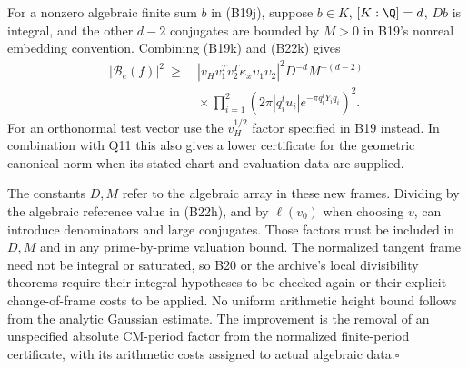 For a nonzero algebraic finite sum $b$ in (B19j), suppose
$b\in K$, $[K:\Q]=d$, $Db$ is integral, and the other
$d-2$ conjugates are bounded by $M>0$ in B19's nonreal
embedding convention.  Combining (B19k) and (B22k) gives
\[
\begin{split}
 |\mathcal B_e(f)|^2\ \geq\ &
 |v_Hv_1^Tv_2^T\kappa_x\upsilon_1\upsilon_2|^2
       D^{-d}M^{-(d-2)}\\
 &{}\times\prod_{i=1}^2
        \left(2\pi|q_i^tu_i|
                      e^{-\pi q_i^tY_iq_i}\right)^2.
\end{split}
 \tag{B22l}
\]
For an orthonormal test vector use the $v_H^{1/2}$ factor
specified in B19 instead.  In combination with Q11 this
also gives a lower certificate for the geometric canonical
norm when its stated chart and evaluation data are supplied.

The constants $D,M$ refer to the algebraic array in these
new frames.  Dividing by the algebraic reference value in
(B22h), and by $\ell(v_0)$ when choosing $v$, can introduce
denominators and large conjugates.  Those factors must be
included in $D,M$ and in any prime-by-prime valuation bound.
The normalized tangent frame need not be integral or
saturated, so B20 or the archive's local divisibility
theorems require their integral hypotheses to be checked
again or their explicit change-of-frame costs to be applied.
No uniform arithmetic height bound follows from the analytic
Gaussian estimate.  The improvement is the removal of an
unspecified absolute CM-period factor from the normalized
finite-period certificate, with its arithmetic costs assigned
to actual algebraic data.\hfill$\square$
